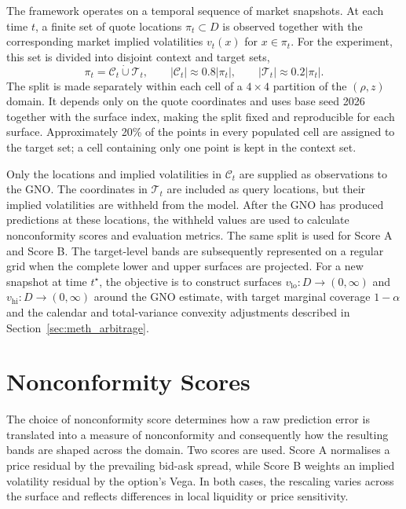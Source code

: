 The framework operates on a temporal sequence of market snapshots. At each time $t$, a finite set of quote locations $\pi_t\subset D$ is observed together with the corresponding market implied volatilities $v_t(x)$ for $x\in\pi_t$. For the experiment, this set is divided into disjoint context and target sets,
\begin{equation}
    \pi_t=\mathcal{C}_t\mathbin{\dot\cup}\mathcal{T}_t,
    \qquad |\mathcal{C}_t|\approx0.8|\pi_t|,
    \qquad |\mathcal{T}_t|\approx0.2|\pi_t|.
    \label{eq:context_target_partition}
\end{equation}
The split is made separately within each cell of a $4\times4$ partition of the $(\rho,z)$ domain. It depends only on the quote coordinates and uses base seed 2026 together with the surface index, making the split fixed and reproducible for each surface. Approximately 20\% of the points in every populated cell are assigned to the target set; a cell containing only one point is kept in the context set.

Only the locations and implied volatilities in $\mathcal{C}_t$ are supplied as observations to the GNO. The coordinates in $\mathcal{T}_t$ are included as query locations, but their implied volatilities are withheld from the model. After the GNO has produced predictions at these locations, the withheld values are used to calculate nonconformity scores and evaluation metrics. The same split is used for Score A and Score B. The target-level bands are subsequently represented on a regular grid when the complete lower and upper surfaces are projected. For a new snapshot at time $t^\star$, the objective is to construct surfaces $v_{\text{lo}}:D\rightarrow(0,\infty)$ and $v_{\text{hi}}:D\rightarrow(0,\infty)$ around the GNO estimate, with target marginal coverage $1-\alpha$ and the calendar and total-variance convexity adjustments described in Section~\ref{sec:meth_arbitrage}.

\section{Nonconformity Scores}
\label{sec:meth_scores}

The choice of nonconformity score determines how a raw prediction error is translated into a measure of nonconformity and consequently how the resulting bands are shaped across the domain. Two scores are used. Score A normalises a price residual by the prevailing bid-ask spread, while Score B weights an implied volatility residual by the option's Vega. In both cases, the rescaling varies across the surface and reflects differences in local liquidity or price sensitivity.

